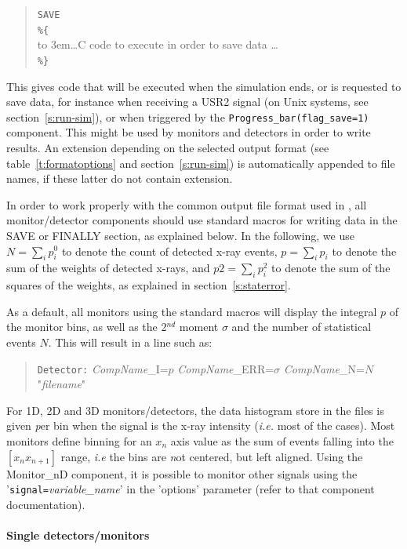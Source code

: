 \begin{quote}
  \texttt{SAVE} \\
  \verb|%{| \\
  \hbox to 3em{}\ldots C code to execute in order to save data \ldots \\
  \verb|%}|
\end{quote}
This gives code that will be executed when the simulation ends, or is requested to save data, for instance when receiving a USR2 signal (on Unix systems, see section~\ref{s:run-sim}), or when triggered by the \texttt{Progress\_bar(flag\_save=1)} component.
This might be used by monitors and detectors in order to write results.
An extension depending on the selected output format (see table~\ref{t:formatoptions} and section~\ref{s:run-sim}) is automatically appended to file names, if these latter do not contain extension.

In order to work properly with the common output file format used in
\MCX, all monitor/detector components should use standard macros for
writing data in the SAVE or FINALLY section, as explained below. In the
following, we use $N = \sum_i p_i^0$ to denote the count of detected
x-ray events, $p = \sum_i p_i$ to denote the sum of the weights of
detected x-rays, and $\textit{p2} = \sum_i p_i^2$ to denote the sum of
the squares of the weights, as explained in section~\ref{s:staterror}.

As a default, all monitors using the standard macros will display the
integral $p$ of the monitor bins, as well as the 2$^{nd}$ moment $\sigma$
and the number of statistical events $N$. This will result in a line such as:

\begin{quote}
\verb+Detector:+ \textit{CompName}\_I=$p$ \textit{CompName}\_ERR=$\sigma$ \textit{CompName}\_N=$N$ "\textit{filename}"
\end{quote}

For 1D, 2D and 3D monitors/detectors, the data histogram store in the files
is given {\emph per bin} when the signal is the x-ray intensity (\textit{i.e.} most of the cases). Most monitors define binning for an $x_n$ axis value as the sum of events falling into the $[ x_n x_{n+1} ]$ range, \textit{i.e} the bins are {\emph not} centered, but left aligned.
Using the Monitor\_nD component, it is possible to monitor other signals using the
'\verb+signal=+\textit{variable\_name}' in the 'options' parameter (refer to that
component documentation).

\paragraph{Single detectors/monitors}
\label{s:DETECTOR_OUT}

